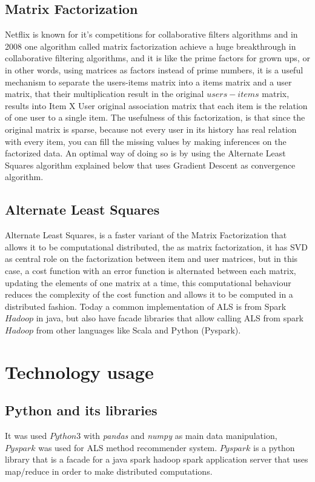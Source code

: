 \documentclass[ecp,tc,english]{iiufrgs}
\begin{document}
        \subsection{Matrix Factorization}
        Netflix is known for it's competitions for collaborative filters algorithms and in 2008 one algorithm called matrix factorization  achieve a huge breakthrough in collaborative filtering algorithms, and it is like the prime factors for grown ups, or in other words, using matrices as factors instead of prime numbers, it is a useful mechanism to separate the users-items matrix into a items matrix and a user matrix, that their multiplication result in the original \(users-items\) matrix, results into Item X User original association matrix that each item is the relation of one user to a single item.
        The usefulness of this factorization, is that since the original matrix is sparse, because not every user in its history has real relation with every item, you can fill the missing values by making inferences on the factorized data.
        An optimal way of doing so is by using the Alternate Least Squares algorithm explained below that uses Gradient Descent as convergence algorithm.
        
        \subsection{Alternate Least Squares}
        Alternate Least Squares, is a faster variant of the Matrix Factorization that allows it to be computational distributed, the as matrix factorization, it has SVD as central role on the factorization between item and user matrices, but in this case, a cost function with an error function is alternated between each matrix, updating the elements of one matrix at a time, this computational behaviour reduces the complexity of the cost function and allows it to be computed in a distributed fashion.
        Today a common implementation of ALS is from Spark \(Hadoop\) in java, but also have facade libraries that allow calling ALS from spark \(Hadoop\) from other languages like Scala and Python (Pyspark).

    \section{Technology usage}

        \subsection{Python and its libraries}
        It was used \(Python3\) with \textit{pandas} \cite{reback2020pandas} and \textit{numpy} as main data manipulation, \(Pyspark\) was used for ALS method recommender system. 
        \(Pyspark\) is a python library that is a facade for a java spark hadoop spark application server that uses map/reduce in order to make distributed computations.
    
\end{document}
